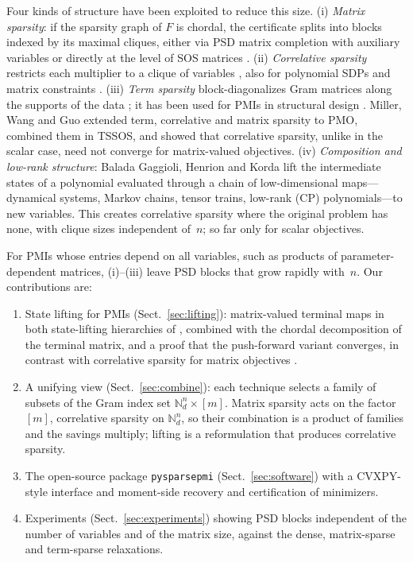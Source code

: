 \documentclass[smallextended]{svjour3}
\newcommand{\N}{\mathbb{N}}
\newcommand{\code}[1]{\texttt{#1}}
\begin{document}
Four kinds of structure have been exploited to reduce this size.
(i) \emph{Matrix sparsity}: if the sparsity graph of $F$ is chordal, the
certificate splits into blocks indexed by its maximal cliques, either via
PSD matrix completion with auxiliary variables
\cite{KimKojimaMevissenYamashita2011} or directly at the level of SOS
matrices \cite{ZhengFantuzzi2023}.
(ii) \emph{Correlative sparsity} restricts each multiplier to a clique of
variables \cite{Waki2006,Lasserre2006}, also for polynomial SDPs and matrix
constraints \cite{KojimaMuramatsu2009,NieQuTangZhang2026}.
(iii) \emph{Term sparsity} block-diagonalizes Gram matrices along the
supports of the data \cite{TSSOS2021,CSTSSOS2022}; it has
been used for PMIs in structural design \cite{HandaTyburecKocvara2025}.
Miller, Wang and Guo \cite{MillerWangGuo2026} extended term, correlative and
matrix sparsity to PMO, combined them in TSSOS, and showed that correlative
sparsity, unlike in the scalar case, need not converge for matrix-valued
objectives.
(iv) \emph{Composition and low-rank structure}: Balada Gaggioli, Henrion
and Korda \cite{BGHK2025,BGHK2026} lift the intermediate states of a
polynomial evaluated through a chain of low-dimensional maps---dynamical
systems, Markov chains, tensor trains, low-rank (CP) polynomials---to new
variables. This creates correlative sparsity where the original problem has
none, with clique sizes independent of~$n$; so far only for scalar
objectives.

For PMIs whose entries depend on all variables, such as products of
parameter-dependent matrices, (i)--(iii) leave PSD blocks that grow rapidly
with~$n$. Our contributions are:
\begin{enumerate}
\item State lifting for PMIs (Sect.~\ref{sec:lifting}): matrix-valued
terminal maps in both state-lifting hierarchies of \cite{BGHK2026}, combined
with the chordal decomposition of the terminal matrix, and a proof that the
push-forward variant converges, in contrast with correlative sparsity for
matrix objectives \cite{MillerWangGuo2026}.
\item A unifying view (Sect.~\ref{sec:combine}): each technique selects a
family of subsets of the Gram index set $\N^n_d\times[m]$. Matrix sparsity
acts on the factor $[m]$, correlative sparsity on $\N^n_d$, so their
combination is a product of families and the savings multiply; lifting is a
reformulation that produces correlative sparsity.
\item The open-source package \code{pysparsepmi} (Sect.~\ref{sec:software})
with a CVXPY-style interface and moment-side recovery and certification of
minimizers.
\item Experiments (Sect.~\ref{sec:experiments}) showing PSD blocks
independent of the number of variables and of the matrix size, against the
dense, matrix-sparse and term-sparse relaxations.
\end{enumerate}
\end{document}
